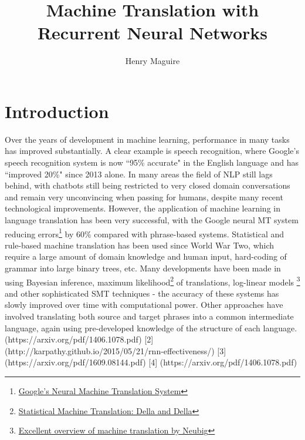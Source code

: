 \documentclass[]{article}
\title{Machine Translation with Recurrent Neural Networks}
\author{Henry Maguire}
\begin{document}
\maketitle


\section{Introduction}
Over the years of development in machine learning, performance in many tasks has improved substantially. A clear example is speech recognition, where Google's speech recognition system is now ``95\% accurate" in the English language and has ``improved 20\%" since 2013 alone. In many areas the field of NLP still lags behind, with chatbots still being restricted to very closed domain conversations and remain very unconvincing when passing for humans, despite many recent technological improvements. However, the application of machine learning in language translation has been very successful, with the Google neural MT system reducing errors\footnote{\href{https://research.google.com/pubs/pub45610.html}{Google's Neural Machine Translation System}} by 60\% compared with phrase-based systems. Statistical and rule-based machine translation has been used since World War Two, which require a large amount of domain knowledge and human input, hard-coding of grammar into large binary trees, etc. Many developments have been made in using Bayesian inference, maximum likelihood\footnote{\href{http://aclweb.org/anthology/H94-1100}{Statistical Machine Translation: Della and Della}} of translations, log-linear models \footnote{\href{https://arxiv.org/pdf/1703.01619.pdf}{Excellent overview of machine translation by Neubig}} and other sophisticated SMT techniques - the accuracy of these systems has slowly improved over time with computational power. Other approaches have involved translating both source and target phrases into a common intermediate language, again using pre-developed knowledge of the structure of each language.
\iffalse
[1](https://arxiv.org/pdf/1406.1078.pdf)
[2] (http://karpathy.github.io/2015/05/21/rnn-effectiveness/)
[3] (https://arxiv.org/pdf/1609.08144.pdf)
[4] (https://arxiv.org/pdf/1406.1078.pdf)
\end{document}
